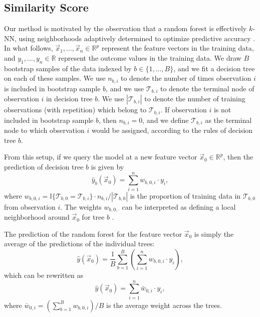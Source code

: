 \documentclass[Review, sageh, times]{sagej}
\begin{document}
\subsection{Similarity Score}

Our method is motivated by the observation that a random forest is effectively $k$-NN, using neighborhoods adaptively determined to optimize predictive accuracy \citep{lin_random_2006}. In what follows, $\vec x_1, ..., \vec x_n \in \mathbb{R}^p$ represent the feature vectors in the training data, and $y_1, ..., y_n \in \mathbb{R}$ represent the outcome values in the training data. We draw $B$ bootstrap samples of the data indexed by $b \in \{1, ..., B\}$, and we fit a decision tree on each of these samples. We use $n_{b,i}$ to denote the number of times observation $i$ is included in bootstrap sample $b$, and we use $\mathcal{T}_{b,i}$ to denote the terminal node of observation $i$ in decision tree $b$. We use $|\mathcal{T}_{b,i}|$ to denote the number of training observations (with repetition) which belong to $\mathcal{T}_{b,i}$. If observation $i$ is not included in bootstrap sample $b$, then $n_{b,i} = 0$, and we define $\mathcal{T}_{b,i}$ as the terminal node to which observation $i$ would be assigned, according to the rules of decision tree $b$.

From this setup, if we query the model at a new feature vector $\vec x_0 \in \mathbb{R}^p$, then the prediction of decision tree $b$ is given by
$$
  \hat{y}_b(\vec x_0) = \sum_{i = 1}^{n} w_{b,0,i} \cdot y_i,
$$
where $w_{b,0,i} = \mathbb{I}\{\mathcal{T}_{b,0} = \mathcal{T}_{b,i}\} \cdot n_{b,i} / |\mathcal{T}_{b,0}|$ is the proportion of training data in $\mathcal{T}_{b,0}$ from observation $i$. The weights $w_{b,0,\cdot}$ can be interpreted as defining a local neighborhood around $\vec x_0$ for tree $b$ \citep{lin_random_2006}.

The prediction of the random forest for the feature vector $\vec x_0$ is simply the average of the predictions of the individual trees:
\begin{equation*}
  \hat{y}(\vec x_0) = \frac{1}{B} \sum_{b = 1}^B \left(\sum_{i = 1}^{n} w_{b,0,i} \cdot y_i\right),
\end{equation*}
which can be rewritten as
\begin{equation}
  \label{eqn:rf-as-knn}
  \hat{y}(\vec x_0) = \sum_{i = 1}^n \bar w_{0,i} \cdot y_i,
\end{equation}
where $\bar w_{0,i} = \left(\sum_{b = 1}^B w_{b,0,i}\right) / B$ is the average weight across the trees.
\end{document}
